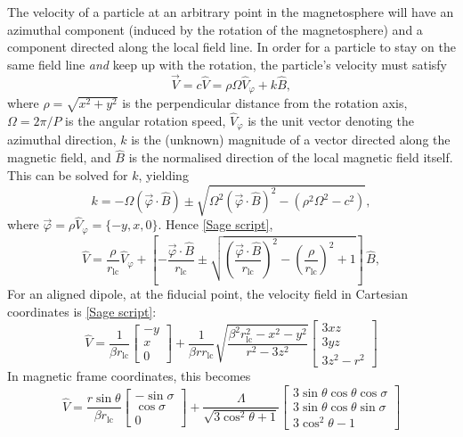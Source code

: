 \documentclass{book}
\newcommand{\phase}{\varphi}
\newcommand{\rL}{r_\text{lc}} %
\newcommand{\linktosage}[1]{\hyperref[#1]{[Sage script]}}
\begin{document}
The velocity of a particle at an arbitrary point in the magnetosphere will have an azimuthal component (induced by the rotation of the magnetosphere) and a component directed along the local field line.
In order for a particle to stay on the same field line \emph{and} keep up with the rotation, the particle's velocity must satisfy
\begin{equation}
    \vec{V} = c\hat{V} = \rho\Omega\hat{V}_\phase + k\hat{B},
\end{equation}
where $\rho = \sqrt{x^2 + y^2}$ is the perpendicular distance from the rotation axis, $\Omega = 2\pi/P$ is the angular rotation speed, $\hat{V}_\phase$ is the unit vector denoting the azimuthal direction, $k$ is the (unknown) magnitude of a vector directed along the magnetic field, and $\hat{B}$ is the normalised direction of the local magnetic field itself.
This can be solved for $k$, yielding
\begin{equation}
    k = -\Omega(\vec{\phase}\cdot\hat{B}) \pm \sqrt{\Omega^2(\vec{\phase}\cdot\hat{B})^2 - (\rho^2\Omega^2-c^2)},
\end{equation}
where $\vec{\phase} = \rho\hat{V}_\phase = \{-y,x,0\}$. Hence \linktosage{sage:Vdip},
\begin{equation}
    \hat{V} = \frac{\rho}{\rL}\hat{V}_\phase + \left[-\frac{\vec{\phase}\cdot\hat{B}}{\rL} \pm
              \sqrt{\left(\frac{\vec{\phase}\cdot\hat{B}}{\rL}\right)^2 - \left(\frac{\rho}{\rL}\right)^2 + 1}\right]\,\hat{B},
\end{equation}
For an aligned dipole, at the fiducial point, the velocity field in Cartesian coordinates is \linktosage{sage:V_aligned}:
\begin{equation}
    \hat{V} = \frac{1}{\beta \rL}\begin{bmatrix} -y \\ x \\ 0 \end{bmatrix} +
        \frac{1}{\beta r\rL}\sqrt{\frac{\beta^2\rL^2 - x^2 - y^2}{r^2-3z^2}} \begin{bmatrix} 3xz \\ 3yz \\ 3z^2-r^2 \end{bmatrix}
\end{equation}
In magnetic frame coordinates, this becomes
\begin{equation}
    \hat{V} = \frac{r\sin\theta}{\beta \rL}\begin{bmatrix} -\sin\sigma \\ \cos\sigma \\ 0 \end{bmatrix} +
        \frac{\Lambda}{\sqrt{3\cos^2\theta + 1}}
        \begin{bmatrix} 3\sin\theta\cos\theta\cos\sigma \\ 3\sin\theta\cos\theta\sin\sigma \\ 3\cos^2\theta-1 \end{bmatrix}
\end{equation}
\end{document}
